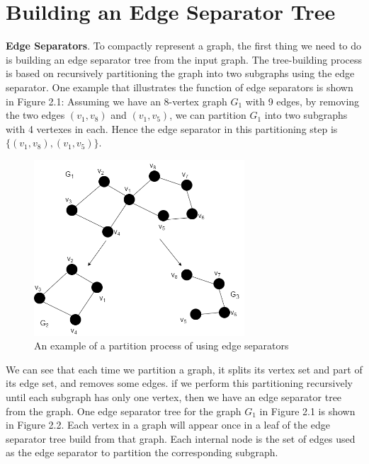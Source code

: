\documentclass[12pt,glossary]{dalthesis}
\begin{document}
\section{Building an Edge Separator Tree}

\textbf{Edge Separators}. To compactly represent a graph, the first thing we need to do is building an edge separator tree from the input graph. The tree-building process is based on recursively partitioning the graph into two subgraphs using the edge separator. One example that illustrates the function of edge separators is shown in Figure 2.1: Assuming we have an 8-vertex graph $G_{1}$ with 9 edges, by removing the two edges $(v_{1}, v_{8})$ and $(v_{1}, v_{5})$, we can partition $G_{1}$ into two subgraphs with 4 vertexes in each. Hence the edge separator in this partitioning step is $\{(v_{1}, v_{8}),(v_{1}, v_{5}) \}$.

\bigskip

\begin{figure}[ht]
\centering
\includegraphics[width=0.7\textwidth]{partition}
\caption{An example of a partition process of using edge separators}
\end{figure}

\bigskip

We can see that each time we partition a graph, it splits its vertex set and part of its edge set, and removes some edges. if we perform this partitioning recursively until each subgraph has only one vertex, then we have an edge separator tree from the graph. One edge separator tree for the graph $G_{1}$ in Figure 2.1 is shown in Figure 2.2. Each vertex in a graph will appear once in a leaf of the edge separator tree build from that graph. Each internal node is the set of edges used as the edge separator to partition the corresponding subgraph.
\end{document}
